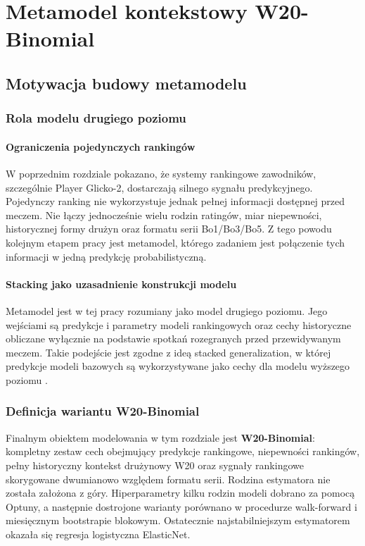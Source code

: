 \chapter{Metamodel kontekstowy W20-Binomial}

\section{Motywacja budowy metamodelu}

\subsection{Rola modelu drugiego poziomu}

\subsubsection{Ograniczenia pojedynczych rankingów}

W poprzednim rozdziale pokazano, że systemy rankingowe zawodników, szczególnie Player Glicko-2, dostarczają silnego sygnału predykcyjnego. Pojedynczy ranking nie wykorzystuje jednak pełnej informacji dostępnej przed meczem. Nie łączy jednocześnie wielu rodzin ratingów, miar niepewności, historycznej formy drużyn oraz formatu serii Bo1/Bo3/Bo5. Z tego powodu kolejnym etapem pracy jest metamodel, którego zadaniem jest połączenie tych informacji w jedną predykcję probabilistyczną.

\subsubsection{Stacking jako uzasadnienie konstrukcji modelu}

Metamodel jest w tej pracy rozumiany jako model drugiego poziomu. Jego wejściami są predykcje i parametry modeli rankingowych oraz cechy historyczne obliczane wyłącznie na podstawie spotkań rozegranych przed przewidywanym meczem. Takie podejście jest zgodne z ideą stacked generalization, w której predykcje modeli bazowych są wykorzystywane jako cechy dla modelu wyższego poziomu \parencite{wolpert1992,breiman1996stacked}.

\subsection{Definicja wariantu W20-Binomial}

Finalnym obiektem modelowania w tym rozdziale jest \textbf{W20-Binomial}: kompletny zestaw cech obejmujący predykcje rankingowe, niepewności rankingów, pełny historyczny kontekst drużynowy W20 oraz sygnały rankingowe skorygowane dwumianowo względem formatu serii. Rodzina estymatora nie została założona z góry. Hiperparametry kilku rodzin modeli dobrano za pomocą Optuny, a następnie dostrojone warianty porównano w procedurze walk-forward i miesięcznym bootstrapie blokowym. Ostatecznie najstabilniejszym estymatorem okazała się regresja logistyczna ElasticNet.

